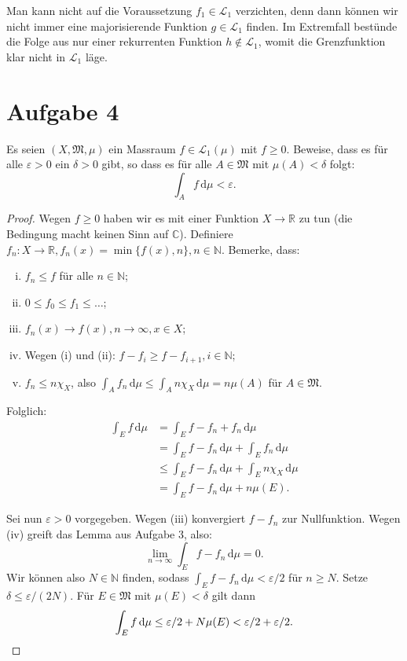 \documentclass[10pt]{article}\usepackage[]{graphicx}\usepackage[]{color}
\newcommand{\N}{\mathbb{N}}
\newcommand{\R}{\mathbb{R}}
\newcommand{\C}{\mathbb{C}}
\newcommand{\df}{\,\textrm{d}}
\begin{document}
Man kann nicht auf die Voraussetzung $f_1 \in \mathscr{L}_1$ verzichten,
denn dann können wir nicht immer eine majorisierende Funktion $g \in \mathscr{L}_1$ finden.
Im Extremfall bestünde die Folge aus nur einer rekurrenten Funktion $h \notin \mathscr{L}_1$,
womit die Grenzfunktion klar nicht in $\mathscr{L}_1$ läge.

\section*{Aufgabe 4}
Es seien $(X, \mathfrak{M}, \mu)$ ein Massraum
$f \in \mathscr{L}_1(\mu)$ mit $f \geq 0$.
Beweise, dass es für alle $\varepsilon > 0$
ein $\delta > 0$ gibt, so dass es für alle 
$A \in \mathfrak{M}$ mit $\mu(A) < \delta$ folgt:
  \[
    \int_A f \df \mu < \varepsilon.
  \]
  
\begin{proof}
  Wegen $f \geq 0$ haben wir es mit einer Funktion $X \to \R$
  zu tun (die Bedingung macht keinen Sinn auf $\C$).
  Definiere $f_n: X \to \R, f_n(x) = \min\{f(x), n\}, n\in \N$.
  Bemerke, dass:
    \begin{enumerate}[(i)]
      \item $f_n \leq f$ für alle $n \in \N$;
      \item $0 \leq f_0 \leq f_1 \leq \dots$;
      \item $f_n(x) \to f(x), n \to \infty, x \in X$;
      \item Wegen (i) und (ii): 
      $f - f_i \geq f - f_{i+1}, i \in \N$;
      \item $f_n \leq n\chi_X$, also $\int_A f_n \df \mu \leq \int_A n \chi_X \df \mu = n\mu(A)$ für $A \in \mathfrak{M}$.
    \end{enumerate}
  Folglich:
  \begin{align*}
    \int_E f \df \mu
    &= \int_E f - f_n + f_n \df \mu \\
    &= \int_E f - f_n \df \mu + \int_E f_n \df \mu \\
    &\leq \int_E f - f_n \df \mu + \int_E n \chi_X \df \mu \\
    &= \int_E f - f_n \df \mu + n\mu(E).
  \end{align*}
  
  Sei nun $\varepsilon > 0$ vorgegeben.
  Wegen (iii) konvergiert $f - f_n$ zur Nullfunktion.
  Wegen (iv) greift das Lemma aus Aufgabe 3, also:
  \[
    \lim_{n\to \infty} \int_E f - f_n \df \mu = 0.
  \]
  Wir können also $N \in \N$ finden, sodass
  $\int_E f - f_n \df \mu < \varepsilon/2$
  für $n \geq N$.
  Setze $\delta \leq \varepsilon/(2N)$.
  Für $E \in \mathfrak{M}$ mit $\mu(E) < \delta$ gilt dann
  \[
    \int_E f \df \mu \leq \varepsilon/2 + N\mu(E) < \varepsilon/2 + \varepsilon/2.\qedhere
  \]
\end{proof}
\end{document}

